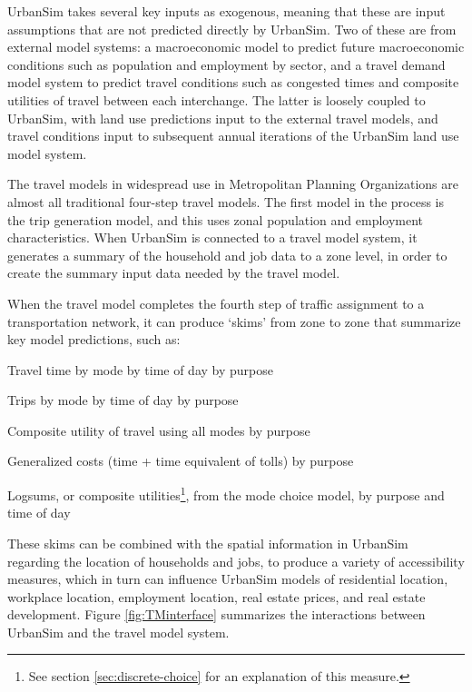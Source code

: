 UrbanSim takes several key inputs as exogenous, meaning that these
are input assumptions that are not predicted directly by UrbanSim.  Two of these are
from external model systems: a macroeconomic model to predict
future macroeconomic conditions such as population and employment
by sector, and a travel demand model system to predict travel
conditions such as congested times and composite utilities of
travel between each interchange.  The latter is loosely coupled to
UrbanSim, with land use predictions input to the external travel
models, and travel conditions input to subsequent annual
iterations of the UrbanSim land use model system.

The travel models in widespread use in Metropolitan Planning Organizations are
almost all traditional four-step travel models.  The first model in the process
is the trip generation model, and this uses zonal population and employment
characteristics.  When UrbanSim is connected to a travel model system,
it generates a summary of the household and job data to a zone level, in order
to create the summary input data needed by the travel model.

When the travel model completes the fourth step of traffic assignment to a
transportation network, it can produce `skims' from zone to zone that summarize
key model predictions, such as:

\squishlist
\item   Travel time by mode by time of day by purpose
\item Trips by mode by time of day by purpose
\item   Composite utility of travel using all modes by purpose
\item Generalized costs (time + time equivalent of tolls) by purpose
\item Logsums, or composite utilities\footnote{See section \ref{sec:discrete-choice} for an explanation of this measure.}, from the mode choice model, by purpose and time of day
\squishend

These skims can be combined with the spatial information in UrbanSim regarding the location of households and jobs, to produce
a variety of accessibility measures, which in turn can influence UrbanSim models of residential location, workplace location, employment
location, real estate prices, and real estate development.  Figure \ref{fig:TMinterface} summarizes the interactions between UrbanSim and
the travel model system.


